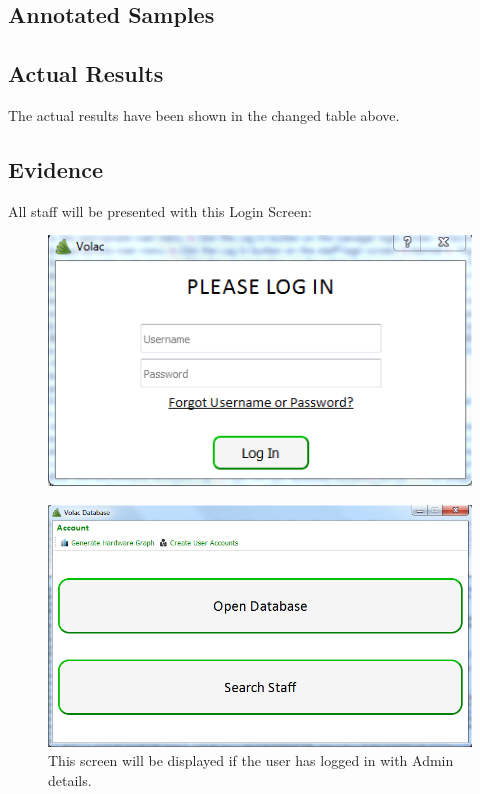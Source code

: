 \begin{landscape}
\section{Annotated Samples}

\subsection{Actual Results}

The actual results have been shown in the changed table above.

\end{landscape}

\subsection{Evidence}

All staff will be presented with this Login Screen:
\begin{figure}[H]
    \includegraphics[width=\textwidth]{./Testing/Images/LoginScreen.png}
    \label{fig:LoginScreen}
\end{figure}

\begin{figure}[H]
    \includegraphics[width=\textwidth]{./Testing/Images/AdminInterface.png}
    \caption{This screen will be displayed if the user has logged in with Admin details.} \label{fig:AdminInterfaceLogin}
\end{figure}

